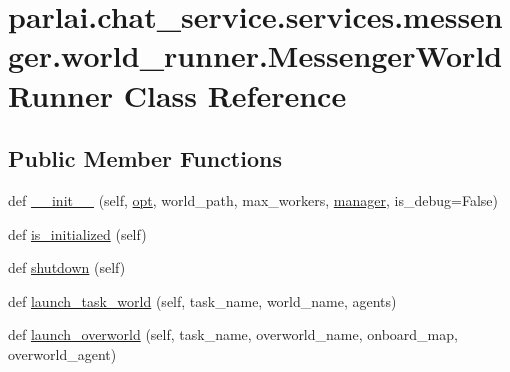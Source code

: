 \hypertarget{classparlai_1_1chat__service_1_1services_1_1messenger_1_1world__runner_1_1MessengerWorldRunner}{}\section{parlai.\+chat\+\_\+service.\+services.\+messenger.\+world\+\_\+runner.\+Messenger\+World\+Runner Class Reference}
\label{classparlai_1_1chat__service_1_1services_1_1messenger_1_1world__runner_1_1MessengerWorldRunner}
\subsection*{Public Member Functions}
\begin{DoxyCompactItemize}
\item 
def \hyperlink{classparlai_1_1chat__service_1_1services_1_1messenger_1_1world__runner_1_1MessengerWorldRunner_ad70eeab49b4a620d85fe332ecb96b360}{\+\_\+\+\_\+init\+\_\+\+\_\+} (self, \hyperlink{classparlai_1_1chat__service_1_1services_1_1messenger_1_1world__runner_1_1MessengerWorldRunner_a42ff6ed9074e14be34091499649f6935}{opt}, world\+\_\+path, max\+\_\+workers, \hyperlink{classparlai_1_1chat__service_1_1services_1_1messenger_1_1world__runner_1_1MessengerWorldRunner_a93b2e11a3222ab28f53520b30e72fd7c}{manager}, is\+\_\+debug=False)
\item 
def \hyperlink{classparlai_1_1chat__service_1_1services_1_1messenger_1_1world__runner_1_1MessengerWorldRunner_ac8ddaf777698c974627ebf3fb4890b6a}{is\+\_\+initialized} (self)
\item 
def \hyperlink{classparlai_1_1chat__service_1_1services_1_1messenger_1_1world__runner_1_1MessengerWorldRunner_a4fab2907172298b233a9512726523432}{shutdown} (self)
\item 
def \hyperlink{classparlai_1_1chat__service_1_1services_1_1messenger_1_1world__runner_1_1MessengerWorldRunner_a45a5944b8a5a786163c3e1ceb9437b15}{launch\+\_\+task\+\_\+world} (self, task\+\_\+name, world\+\_\+name, agents)
\item 
def \hyperlink{classparlai_1_1chat__service_1_1services_1_1messenger_1_1world__runner_1_1MessengerWorldRunner_a2ab603448517f5d973e2079499f1cbed}{launch\+\_\+overworld} (self, task\+\_\+name, overworld\+\_\+name, onboard\+\_\+map, overworld\+\_\+agent)
\end{DoxyCompactItemize}
